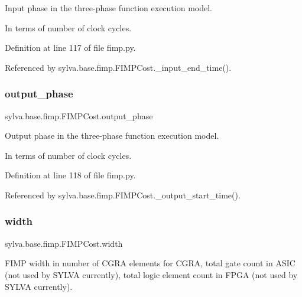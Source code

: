 Input phase in the three-\/phase function execution model. 

In terms of number of clock cycles. 

Definition at line 117 of file fimp.\+py.



Referenced by sylva.\+base.\+fimp.\+F\+I\+M\+P\+Cost.\+\_\+input\+\_\+end\+\_\+time().

\mbox{\label{classsylva_1_1base_1_1fimp_1_1_f_i_m_p_cost_a49cd73cf2ea2a999de46e265c0346f3f}} 
\subsubsection{\texorpdfstring{output\+\_\+phase}{output\_phase}}
{\footnotesize\ttfamily sylva.\+base.\+fimp.\+F\+I\+M\+P\+Cost.\+output\+\_\+phase}



Output phase in the three-\/phase function execution model. 

In terms of number of clock cycles. 

Definition at line 118 of file fimp.\+py.



Referenced by sylva.\+base.\+fimp.\+F\+I\+M\+P\+Cost.\+\_\+output\+\_\+start\+\_\+time().

\mbox{\label{classsylva_1_1base_1_1fimp_1_1_f_i_m_p_cost_a40224d915dcc08c4d54e9ac3006047b1}} 
\subsubsection{\texorpdfstring{width}{width}}
{\footnotesize\ttfamily sylva.\+base.\+fimp.\+F\+I\+M\+P\+Cost.\+width}



F\+I\+MP width in number of C\+G\+RA elements for C\+G\+RA, total gate count in A\+S\+IC (not used by S\+Y\+L\+VA currently), total logic element count in F\+P\+GA (not used by S\+Y\+L\+VA currently). 



